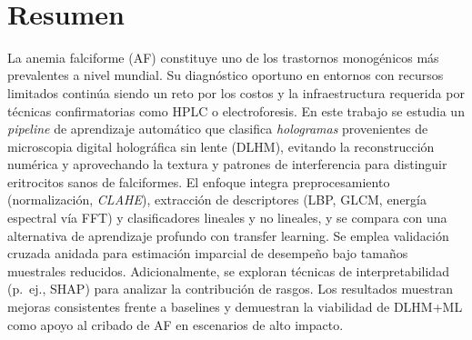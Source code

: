 \
\chapter*{Resumen}
La anemia falciforme (AF) constituye uno de los trastornos monogénicos más prevalentes a nivel mundial. Su diagnóstico oportuno en entornos con recursos limitados continúa siendo un reto por los costos y la infraestructura requerida por técnicas confirmatorias como HPLC o electroforesis. En este trabajo se estudia un \emph{pipeline} de aprendizaje automático que clasifica \emph{hologramas} provenientes de microscopia digital holográfica sin lente (DLHM), evitando la reconstrucción numérica y aprovechando la textura y patrones de interferencia para distinguir eritrocitos sanos de falciformes. El enfoque integra preprocesamiento (normalización, \emph{CLAHE}), extracción de descriptores (LBP, GLCM, energía espectral vía FFT) y clasificadores lineales y no lineales, y se compara con una alternativa de aprendizaje profundo con transfer learning. Se emplea validación cruzada anidada para estimación imparcial de desempeño bajo tamaños muestrales reducidos. Adicionalmente, se exploran técnicas de interpretabilidad (p.~ej., SHAP) para analizar la contribución de rasgos. Los resultados muestran mejoras consistentes frente a baselines y demuestran la viabilidad de DLHM+ML como apoyo al cribado de AF en escenarios de alto impacto.
